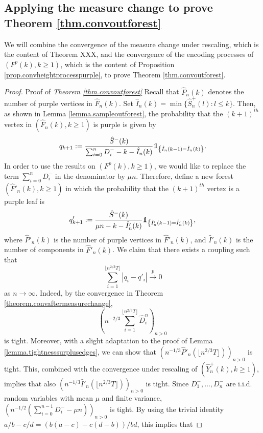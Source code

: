 \subsection{Applying the measure change to prove Theorem \ref{thm.convoutforest}}\label{subsubsec.convaftermeasurechange}

We will combine the convergence of the measure change under rescaling, which is the content of Theorem XXX, and the convergence of the encoding processes of $(F^p(k),k\geq 1)$, which is the content of Proposition \ref{prop.convheightprocesspurple}, to prove Theorem \ref{thm.convoutforest}.

\begin{proof}{Proof of \emph{Theorem \ref{thm.convoutforest}}}
Recall that $\hat{P}_n(k)$ denotes the number of purple vertices in $\hat{F}_n(k)$. Set $\hat{I}_n(k)=\min\{\hat{S}^{+}_n(l):l\leq k\}$. Then, as shown in Lemma \ref{lemma.sampleoutforest}, the probability that the $(k+1)^{th}$ vertex in $(\hat{F}_n(k),k\geq 1)$ is purple is given by
$$q_{k+1}:=\frac{\hat{S}^-(k)}{\sum_{i=0}^n D^-_i-k-\hat{I}_n(k)}\one_{\left\{\hat{I}_n(k-1)= \hat{I}_n(k)\right\}}.$$
In order to use the results on $(F^p(k),k\geq 1)$, we would like to replace the term $\sum_{i=0}^n D^-_i$ in the denominator by $\mu n$. Therefore, define a new forest $(\hat{F}'_n(k), k\geq 1)$ in which the probability that the $(k+1)^{th}$ vertex is a purple leaf is
$${q}'_{k+1}:=\frac{\hat{S}^-(k)}{\mu n-k-\hat{I}'_n(k)}\one_{\left\{\hat{I}'_n(k-1)=\hat{I}'_n(k)\right\}},$$
where $\hat{P}'_n(k)$ is the number of purple vertices in $\hat{F}'_n(k)$, and $\hat{I}'_n(k)$ is the number of components in $\hat{F}'_n(k)$. 
We claim that there exists a coupling such that
$$\sum_{i=1}^{\lfloor n^{2/3}T\rfloor }|q_i-q'_i|\overset{p}{\to}0$$
as $n\to \infty$. 
Indeed, by the convergence in Theorem \ref{theorem.convaftermeasurechange}, 
$$\left(n^{-2/3}\sum_{i=1}^{\lfloor n^{2/3}T\rfloor} \hat{D}^n_i\right)_{n>0}$$ is tight. Moreover, with a slight adaptation to the proof of Lemma \ref{lemma.tightnesssurplusedges}, we can show that $\left(n^{-1/3}\hat{P}'_n\left(\lfloor n^{2/3}T\rfloor \right)\right)_{n>0}$ is tight. This, combined with the convergence under rescaling of $(\hat{Y}^+_n(k),k\geq 1)$, implies that also $\left(n^{-1/3}\hat{I}'_n\left(\lfloor n^{2/3}T\rfloor \right)\right)_{n>0}$ is tight.  Since $D^-_1,\dots,D^-_n$ are i.i.d. random variables with mean $\mu$ and finite variance,
$\left(n^{-1/2}\left(\sum_{i=0}^{n-1}D^-_i-\mu n\right)\right)_{n>0}$ is tight. By using the trivial identity $a/b-c/d=(b(a-c)-c(d-b))/bd$, this implies that

\end{proof}
